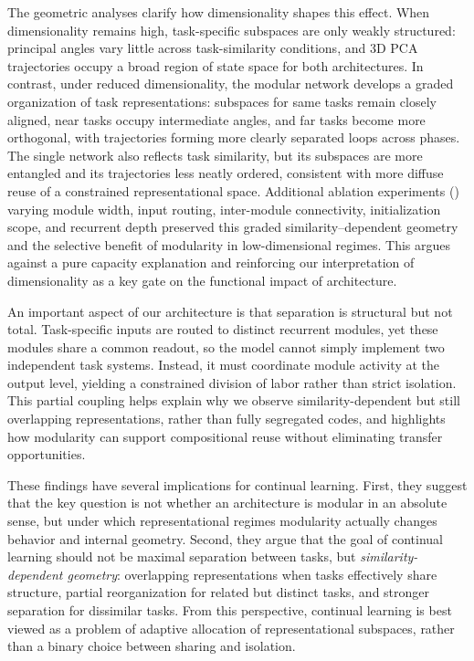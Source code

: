 \documentclass{article}
\theoremstyle{plain}
\theoremstyle{definition}
\theoremstyle{remark}
\begin{document}
The geometric analyses clarify how dimensionality shapes this effect. When dimensionality remains high, task-specific subspaces are only weakly structured: principal angles vary little across task-similarity conditions, and 3D PCA trajectories occupy a broad region of state space for both architectures. In contrast, under reduced dimensionality, the modular network develops a graded organization of task representations: subspaces for same tasks remain closely aligned, near tasks occupy intermediate angles, and far tasks become more orthogonal, with trajectories forming more clearly separated loops across phases. The single network also reflects task similarity, but its subspaces are more entangled and its trajectories less neatly ordered, consistent with more diffuse reuse of a constrained representational space. Additional ablation experiments () varying module width, input routing, inter-module connectivity, initialization scope, and recurrent depth preserved this graded similarity–dependent geometry and the selective benefit of modularity in low-dimensional regimes. This argues against a pure capacity explanation and reinforcing our interpretation of dimensionality as a key gate on the functional impact of architecture.

An important aspect of our architecture is that separation is structural but not total. Task-specific inputs are routed to distinct recurrent modules, yet these modules share a common readout, so the model cannot simply implement two independent task systems. Instead, it must coordinate module activity at the output level, yielding a constrained division of labor rather than strict isolation. This partial coupling helps explain why we observe similarity-dependent but still overlapping representations, rather than fully segregated codes, and highlights how modularity can support compositional reuse without eliminating transfer opportunities.

These findings have several implications for continual learning. First, they suggest that the key question is not whether an architecture is modular in an absolute sense, but under which representational regimes modularity actually changes behavior and internal geometry. Second, they argue that the goal of continual learning should not be maximal separation between tasks, but \emph{similarity-dependent geometry}: overlapping representations when tasks effectively share structure, partial reorganization for related but distinct tasks, and stronger separation for dissimilar tasks. From this perspective, continual learning is best viewed as a problem of adaptive allocation of representational subspaces, rather than a binary choice between sharing and isolation.
\end{document}
